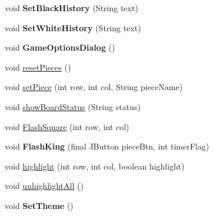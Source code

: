 \begin{DoxyCompactItemize}
\item 
\hypertarget{classswantech_1_1_game_board_a96ebddb815846afa4c27770196677e93}{}void {\bfseries Set\+Black\+History} (String text)\label{classswantech_1_1_game_board_a96ebddb815846afa4c27770196677e93}

\item 
\hypertarget{classswantech_1_1_game_board_ad3af6eb08224d1765b3d7d350b35235e}{}void {\bfseries Set\+White\+History} (String text)\label{classswantech_1_1_game_board_ad3af6eb08224d1765b3d7d350b35235e}

\item 
\hypertarget{classswantech_1_1_game_board_a0c035906eeeb258acfaa8b5d55d0ca0f}{}void {\bfseries Game\+Options\+Dialog} ()\label{classswantech_1_1_game_board_a0c035906eeeb258acfaa8b5d55d0ca0f}

\item 
void \hyperlink{classswantech_1_1_game_board_a8b593a2b2e1f7ace526aaeceaef99724}{reset\+Pieces} ()
\item 
void \hyperlink{classswantech_1_1_game_board_add61d2ac401b20f5f847ca0e96c9caa5}{set\+Piece} (int row, int col, String piece\+Name)
\item 
void \hyperlink{classswantech_1_1_game_board_aa19d65d287fdbcc49088dfe04b1d02d8}{show\+Board\+Status} (String status)
\item 
void \hyperlink{classswantech_1_1_game_board_a37481f0e2444ee2e092edc3e714382bc}{Flash\+Square} (int row, int col)
\item 
\hypertarget{classswantech_1_1_game_board_acb2c628f03939ded12ccfee1c32a9c23}{}void {\bfseries Flash\+King} (final J\+Button piece\+Btn, int timer\+Flag)\label{classswantech_1_1_game_board_acb2c628f03939ded12ccfee1c32a9c23}

\item 
void \hyperlink{classswantech_1_1_game_board_a77b64cccf5aaa809b608c4a8de53ccd9}{highlight} (int row, int col, boolean highlight)
\item 
void \hyperlink{classswantech_1_1_game_board_aaa24ba8f39f0246860a47641f71a6ddf}{unhighlight\+All} ()
\item 
\hypertarget{classswantech_1_1_game_board_a0a4e857cfd4b2a7a1b9ac6fa9073a968}{}void {\bfseries Set\+Theme} ()\label{classswantech_1_1_game_board_a0a4e857cfd4b2a7a1b9ac6fa9073a968}

\end{DoxyCompactItemize}
